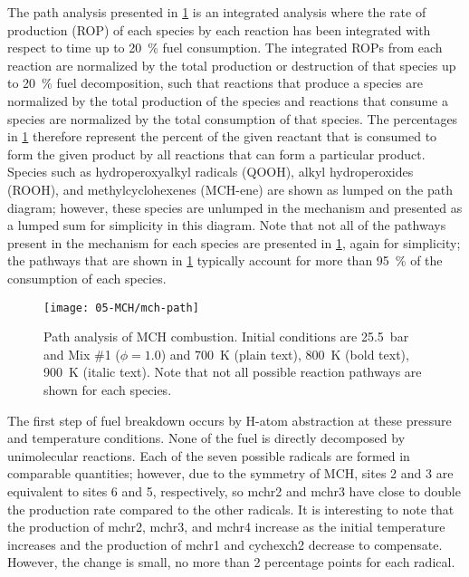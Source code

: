 \documentclass[../main.tex]{subfiles}
\begin{document}
The path analysis presented in \cref{fig:mch-path} is an integrated analysis
where the rate of production (ROP) of each species by each reaction has been
integrated with respect to time up to \SI{20}{\percent} fuel consumption. The integrated
ROPs from each reaction are normalized by the total production or destruction
of that species up to \SI{20}{\percent} fuel decomposition, such that reactions that produce
a species are normalized by the total production of the species and reactions
that consume a species are normalized by the total consumption of that species.
The percentages in \cref{fig:mch-path} therefore represent the percent of the given
reactant that is consumed to form the given product by all reactions that can
form a particular product. Species such as hydroperoxyalkyl radicals (QOOH),
alkyl hydroperoxides (ROOH), and methylcyclohexenes (MCH-ene) are shown as
lumped on the path diagram; however, these species are unlumped in the
mechanism and presented as a lumped sum for simplicity in this diagram. Note
that not all of the pathways present in the mechanism for each species are
presented in \cref{fig:mch-path}, again for simplicity; the pathways that are shown in
\cref{fig:mch-path} typically account for more than \SI{95}{\percent} of the consumption
of each species.

\begin{figure}
    \texttt{[image: 05-MCH/mch-path]}
    \caption[Path analysis of MCH combustion. Initial conditions are \SI{25.5}{\bar}
    and Mix \#1 ($\phi=\num{1.0}$) and \SI{700}{\kelvin} (plain text),
    \SI{800}{\kelvin} (bold text), \SI{900}{\kelvin} (italic text).
    Note that not all possible reaction pathways are shown for
    each\newline species.]{Path analysis of MCH combustion. Initial conditions are \SI{25.5}{\bar}
    and Mix \#1 ($\phi=\num{1.0}$) and \SI{700}{\kelvin} (plain text),
    \SI{800}{\kelvin} (bold text), \SI{900}{\kelvin} (italic text).
    Note that not all possible reaction pathways are shown for
    each species.}
    \label{fig:mch-path}
\end{figure}

The first step of fuel breakdown occurs by H-atom abstraction at these pressure
and temperature conditions. None of the fuel is directly decomposed by
unimolecular reactions. Each of the seven possible radicals are formed in
comparable quantities; however, due to the symmetry of MCH, sites 2 and 3 are
equivalent to sites 6 and 5, respectively, so mchr2 and mchr3 have close to
double the production rate compared to the other radicals. It is interesting to
note that the production of mchr2, mchr3, and mchr4 increase as the initial
temperature increases and the production of mchr1 and cychexch2 decrease to
compensate. However, the change is small, no more than \num{2} percentage points for
each radical.
\end{document}

